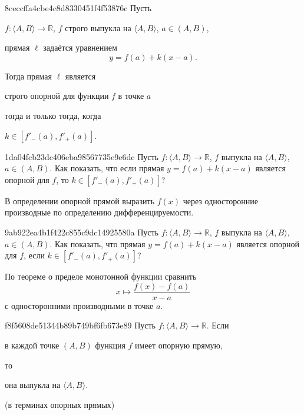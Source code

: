 \begin{note}{8ceccffa4cbe4c8d8330451f4f53876c}
    Пусть \begin{icloze}{4}\( f : \langle A, B \rangle \to \mathbb R  \), \( f \) строго выпукла на \( \langle A, B \rangle  \), \( a \in (A, B) \),\end{icloze} прямая \( \ell \) задаётся уравнением
    \[
        y = f(a) + k(x - a).
    \]

    Тогда прямая \( \ell  \) является \begin{icloze}{1}строго опорной для функции \( f \) в точке \( a \)\end{icloze} \begin{icloze}{3}тогда и только тогда, когда\end{icloze} \begin{icloze}{2}\( k \in [f'_-(a), f'_+(a)]\).\end{icloze}
\end{note}

\begin{note}{1da04fcb23dc406eba98567735e9e6dc}
    Пусть \({ f : \langle A, B \rangle \to \mathbb R }\), \({ f }\) выпукла на \({ \langle A, B \rangle }\), \({ a \in (A, B) }\).
    Как показать, что если прямая \( y = f(a) + k(x - a) \) является опорной для \({ f }\), то \({ k \in [f'_-(a), f'_+(a)] }\)?

    \begin{cloze}{1}
        В определении опорной прямой выразить \({ f(x) }\) через односторонние производные по определению дифференцируемости.
    \end{cloze}
\end{note}

\begin{note}{9ab922ea4b1f422c855c9dc14925580a}
    Пусть \({ f : \langle A, B \rangle \to \mathbb R }\), \({ f }\) выпукла на \({ \langle A, B \rangle }\), \({ a \in (A, B) }\).
    Как показать, что прямая \( y = f(a) + k(x - a) \) является опорной для \({ f }\), если \({ k \in [f'_-(a), f'_+(a)] }\)?

    \begin{cloze}{1}
        По теореме о пределе монотонной функции сравнить
        \[
            x \mapsto \frac{f(x) - f(a)}{x - a}
        \]
        с односторонними производными в точке \({ a }\).
    \end{cloze}
\end{note}

\begin{note}{f8f5608de51344b89b749bf6fb673e89}
    Пусть \({ f : \langle A, B \rangle \to \mathbb R }\).
    Если \begin{icloze}{2}в каждой точке \({ (A, B) }\) функция \({ f }\) имеет опорную прямую,\end{icloze} то \begin{icloze}{1}она выпукла на \({ \langle A, B \rangle }\).\end{icloze}

    \begin{center}
        \tiny
        (в терминах опорных прямых)
    \end{center}
\end{note}

